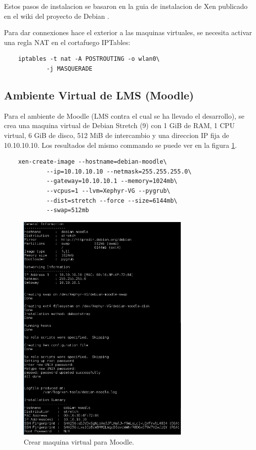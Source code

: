 Estos pasos de instalacion se basaron en la guia de instalacion de Xen publicado en el wiki del proyecto de Debian \citep{Debian-Wiki-Xen}.

Para dar connexiones hace el exterior a las maquinas virtuales, se necesita activar una regla NAT en el cortafuego IPTables:

\begin{lstlisting}
	iptables -t nat -A POSTROUTING -o wlan0\
    		-j MASQUERADE
\end{lstlisting}

\subsection{Ambiente Virtual de LMS (Moodle)}
\label{instalacion-moodle}

Para el ambiente de Moodle (LMS contra el cual se ha llevado el desarrollo), se crea una maquina virtual de Debian Stretch (9) con 1 GiB de RAM, 1 CPU virtual, 6 GiB de disco, 512 MiB de intercambio y una direccion IP fija de 10.10.10.10. Los resultados del mismo commando se puede ver en la figura \ref{vm-moodle}.
\begin{lstlisting}
	xen-create-image --hostname=debian-moodle\
    		--ip=10.10.10.10 --netmask=255.255.255.0\
        	--gateway=10.10.10.1 --memory=1024mb\
        	--vcpus=1 --lvm=Xephyr-VG --pygrub\
        	--dist=stretch --force --size=6144mb\
        	--swap=512mb
\end{lstlisting}

\begin{figure}
	\begin{center}
    	\includegraphics[width=0.75\textwidth]{Figures/crear-moodle.png}
    \end{center}
  	\caption{Crear maquina virtual para Moodle.}
    \label{vm-moodle}
\end{figure}

